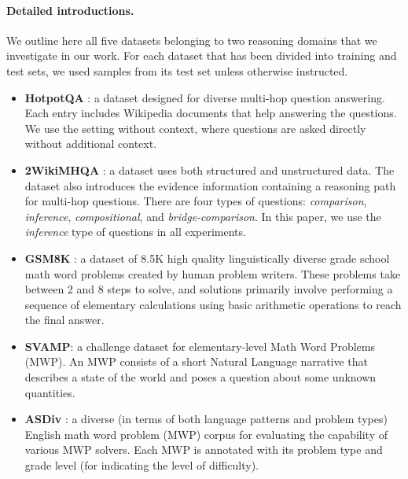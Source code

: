 \documentclass[11pt]{article}
\begin{document}
\paragraph{Detailed introductions.}
We outline here all five datasets belonging to two reasoning domains that we investigate in our work. For each dataset that has been divided into training and test sets, we used samples from its test set unless otherwise instructed.
\begin{itemize}
    \item \textbf{HotpotQA} \citep{yang2018hotpotqa}: a dataset designed for diverse multi-hop question answering. Each entry includes Wikipedia documents that help answering the questions. We use the setting without context, where questions are asked directly without additional context.
    \item \textbf{2WikiMHQA} \citep{ho2020constructing}: a dataset uses both structured and unstructured data. The dataset also introduces the evidence information containing a reasoning path for multi-hop questions. There are four types of questions: \textit{comparison}, \textit{inference}, \textit{compositional}, and \textit{bridge-comparison}.
    In this paper, we use the \textit{inference} type of questions in all experiments.
    \item \textbf{GSM8K} \citep{cobbe2021training}: a dataset of 8.5K high quality linguistically diverse grade school math word problems created by human problem writers. These problems take between 2 and 8 steps to solve, and solutions primarily involve performing a sequence of elementary calculations using basic arithmetic operations to reach the final answer.
    \item \textbf{SVAMP}\citep{patel2021nlp}: a challenge dataset for elementary-level Math Word Problems (MWP). An MWP consists of a short Natural Language narrative that describes a state of the world and poses a question about some unknown quantities.
    \item \textbf{ASDiv} \citep{miao2021diverse}: a diverse (in terms of both language patterns and problem types) English math word problem (MWP) corpus for evaluating the capability of various MWP solvers. Each MWP is annotated with its problem type and grade level (for indicating the level of difficulty).
\end{itemize}
\end{document}
